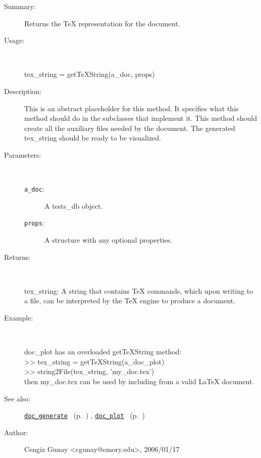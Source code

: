 \begin{description}
\item[Summary:]Returns the TeX representation for the document.
%
\item[Usage:]~%
\begin{lyxcode}%
tex\_string = getTeXString(a\_doc, props)
%
\end{lyxcode}%
%
\item[Description:]%
This is an abstract placeholder for this method. It specifies what this 
 method should do in the subclasses that implement it. This method should
 create all the auxiliary files needed by the document. The generated tex\_string
 should be ready to be visualized.
\item[Parameters:]~
\begin{description}%
\item[\texttt{a\_doc}:]
 A tests\_db object.
\item[\texttt{props}:]
 A structure with any optional properties.
\end{description}%
%
\item[Returns:
]~

	tex\_string: A string that contains TeX commands, which upon writing to a file,
	  can be interpreted by the TeX engine to produce a document.
%
\item[Example:]~
\begin{lyxcode}        doc\_plot has an overloaded getTeXString method:
\\%
        >> tex\_string = getTeXString(a\_doc\_plot)
\\%
        >> string2File(tex\_string, 'my\_doc.tex')
\\%
        then my\_doc.tex can be used by including from a valid LaTeX document.
\\%
\end{lyxcode}
%
\item[See also:]%
\hyperlink{ref_doc_generate}{\texttt{doc\_generate}}%
\ (p.~\pageref{ref_doc_generate})%
%
, \hyperlink{ref_doc_plot}{\texttt{doc\_plot}}%
\ (p.~\pageref{ref_doc_plot})%
%
%
\item[Author:]%
Cengiz Gunay <cgunay@emory.edu>, 2006/01/17
%
\end{description}
\methodline%
